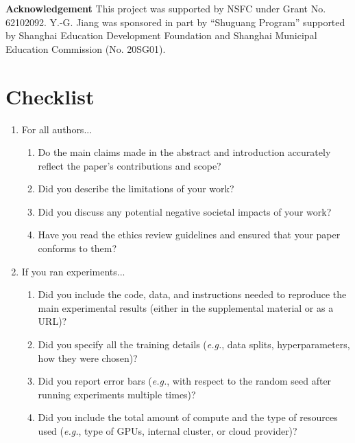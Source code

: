 \documentclass{article}
\makeatletter
\newcommand*{\eg}{\emph{e.g.}\@\xspace}
\makeatother
\begin{document}
\vspace{0.05in}

\textbf{Acknowledgement} This project  was supported by NSFC under Grant No. 62102092. Y.-G. Jiang was sponsored in part by ``Shuguang Program'' supported by Shanghai Education Development Foundation and Shanghai Municipal Education Commission (No. 20SG01).

\clearpage






\section*{Checklist}

\begin{enumerate}


\item For all authors...
\begin{enumerate}
  \item Do the main claims made in the abstract and introduction accurately reflect the paper's contributions and scope?
    \answerYes{}
  \item Did you describe the limitations of your work?
    \answerYes{}
  \item Did you discuss any potential negative societal impacts of your work?
    \answerYes{}
  \item Have you read the ethics review guidelines and ensured that your paper conforms to them?
    \answerYes{}
\end{enumerate}


\item If you ran experiments...
\begin{enumerate}
  \item Did you include the code, data, and instructions needed to reproduce the main experimental results (either in the supplemental material or as a URL)?
  \item Did you specify all the training details (\eg, data splits, hyperparameters, how they were chosen)?
    \answerYes{}
        \item Did you report error bars (\eg, with respect to the random seed after running experiments multiple times)?
        \item Did you include the total amount of compute and the type of resources used (\eg, type of GPUs, internal cluster, or cloud provider)?
    \answerYes{}
\end{enumerate}



\end{enumerate}
\end{document}
